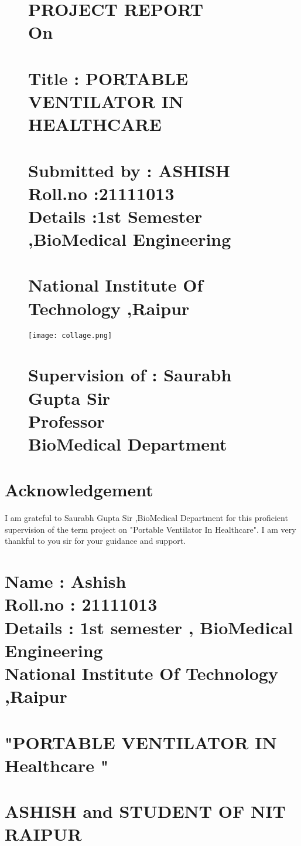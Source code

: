\documentclass[12pt]{article}
\begin{document}
\begin{figure}
\section*{PROJECT REPORT \\On\\\\Title : PORTABLE VENTILATOR IN HEALTHCARE\\\\Submitted by : ASHISH \\Roll.no :21111013\\Details :1st Semester ,BioMedical Engineering \\\\National Institute Of Technology ,Raipur}


\centering
\texttt{[image: collage.png]}

\section*{Supervision of : Saurabh Gupta Sir\\Professor\\BioMedical Department }



\end{figure}

\clearpage
\section*{Acknowledgement}
I am grateful to Saurabh Gupta Sir ,BioMedical Department for this proficient supervision of the term project on "Portable Ventilator In Healthcare". I am very thankful to you sir for your guidance and support.



\section*{Name : Ashish\\Roll.no : 21111013\\Details : 1st semester , BioMedical Engineering\\National Institute Of Technology ,Raipur}

\clearpage
\section*{"PORTABLE VENTILATOR IN Healthcare "}
\section*{ASHISH and STUDENT OF NIT RAIPUR}
\end{document}
